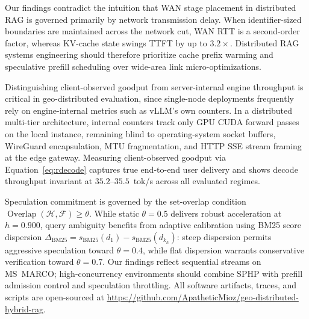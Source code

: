 \documentclass[conference,a4paper]{IEEEtran}
\makeatletter
\def\section{\@startsection{section}{1}{\z@}{1.0ex plus 0.2ex minus 0.2ex}{0.5ex plus 0.1ex minus 0.1ex}{\normalfont\normalsize\centering\scshape}}
\makeatother
\begin{document}
\section{Discussion}
\label{sec:discussion}
Our findings contradict the intuition that WAN stage placement in distributed RAG is governed primarily by network transmission delay. When identifier-sized boundaries are maintained across the network cut, WAN RTT is a second-order factor, whereas KV-cache state swings TTFT by up to $3.2\times$. Distributed RAG systems engineering should therefore prioritize cache prefix warming and speculative prefill scheduling over wide-area link micro-optimizations.

Distinguishing client-observed goodput from server-internal engine throughput is critical in geo-distributed evaluation, since single-node deployments frequently rely on engine-internal metrics such as vLLM's own counters. In a distributed multi-tier architecture, internal counters track only GPU CUDA forward passes on the local instance, remaining blind to operating-system socket buffers, WireGuard encapsulation, MTU fragmentation, and HTTP SSE stream framing at the edge gateway. Measuring client-observed goodput via Equation~\eqref{eq:rdecode} captures true end-to-end user delivery and shows decode throughput invariant at $35.2$--$35.5$~tok/s across all evaluated regimes.

Speculation commitment is governed by the set-overlap condition $\operatorname{Overlap}(\mathcal{H}, \mathcal{F}) \ge \theta$. While static $\theta = 0.5$ delivers robust acceleration at $h = 0.900$, query ambiguity benefits from adaptive calibration using BM25 score dispersion $\Delta_{\mathrm{BM25}} = s_{\mathrm{BM25}}(d_1) - s_{\mathrm{BM25}}(d_{k_h})$: steep dispersion permits aggressive speculation toward $\theta = 0.4$, while flat dispersion warrants conservative verification toward $\theta = 0.7$. Our findings reflect sequential streams on MS~MARCO; high-concurrency environments should combine SPHP with prefill admission control and speculation throttling. All software artifacts, traces, and scripts are open-sourced at \url{https://github.com/ApatheticMioz/geo-distributed-hybrid-rag}.

\end{document}
